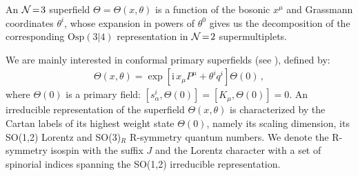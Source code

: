 \documentclass[a4paper,12pt]{article}
\begin{document}
\par
An ${\cal N}\!=\!3$ superfield $\Theta=\Theta(x,\theta)$ is
a function of the bosonic $x^\mu$ and Grassmann coordinates
$\theta^i$, whose expansion in powers of $\theta^0$ gives us
the decomposition of the corresponding $\mathrm{Osp(3|4)}$
representation in ${\cal N}\!=\!2$ supermultiplets.
\par
We are mainly interested in conformal primary superfields
(see \cite{gunaydinminiczagerman2, macksalam}), defined by:
\begin{eqnarray}
\Theta(x, \theta) =\exp \left [\mbox{i}\, x_\mu P^\mu + \theta^i
q^i\right ]\Theta(0)\,,
\label{3Dsuperfield}
\end{eqnarray}
where $\Theta(0)$ is a primary field: $[s_\alpha^i,\Theta(0)]
=[K_\mu,\Theta(0)]=0$.
An irreducible representation of the superfield $\Theta(x, \theta)$
is characterized by the Cartan labels of its highest weight state
$\Theta(0)$, namely its scaling dimension, its SO(1,2) Lorentz and
SO(3)$_R$ R-symmetry quantum numbers.
We denote the R-symmetry isospin with the suffix $J$ and the
Lorentz character with a set of spinorial indices spanning the
SO(1,2) irreducible representation.
\end{document}
